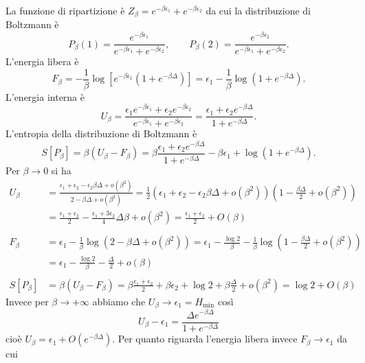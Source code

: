 \begin{solution}
    La funzione di ripartizione è $ Z_\beta = e^{-\beta \epsilon_1} + e^{-\beta \epsilon_2} $ da cui la distribuzione di Boltzmann è
    \[
        P_\beta(1) = \frac{e^{-\beta\epsilon_1}}{e^{-\beta \epsilon_1} + e^{-\beta \epsilon_2}}, \qquad P_\beta(2) = \frac{e^{-\beta\epsilon_2}}{e^{-\beta \epsilon_1} + e^{-\beta \epsilon_2}}.
    \]
    L'energia libera è
    \[
        F_\beta = -\frac{1}{\beta} \log{\left[e^{-\beta\epsilon_1}(1+e^{-\beta\Delta})\right]} = \epsilon_1 - \frac{1}{\beta} \log{\left(1+e^{-\beta\Delta}\right)}.
    \]
    L'energia interna è
    \[
        U_\beta = \frac{\epsilon_1 e^{-\beta\epsilon_1} + \epsilon_2 e^{-\beta \epsilon_2}}{e^{-\beta \epsilon_1} + e^{-\beta \epsilon_2}} = \frac{\epsilon_1 + \epsilon_2 e^{-\beta\Delta}}{1+e^{-\beta\Delta}}.
    \]
    L'entropia della distribuzione di Boltzmann è
    \[
        S[P_\beta] = \beta(U_\beta - F_\beta) = \beta \frac{\epsilon_1 + \epsilon_2 e^{-\beta\Delta}}{1+e^{-\beta\Delta}} - \beta\epsilon_1 + \log{\left(1+e^{-\beta\Delta}\right)}.
    \]
    Per $ \beta \to 0 $ si ha
    \begin{align*}
        U_\beta & = \frac{\epsilon_1 + \epsilon_2 - \epsilon_2 \beta\Delta + o(\beta^2)}{2 - \beta\Delta + o(\beta^2)} = \frac{1}{2}(\epsilon_1 + \epsilon_2 - \epsilon_2 \beta\Delta + o(\beta^2))\left(1 - \frac{\beta \Delta}{2} + o(\beta^2)\right) \\
        & = \frac{\epsilon_1 + \epsilon_2}{2} - \frac{\epsilon_1 + 3\epsilon_2}{4} \Delta \beta + o(\beta^2) = \frac{\epsilon_1 + \epsilon_2}{2} + O(\beta) \\
        & \ \\
        F_\beta & = \epsilon_1 - \frac{1}{\beta} \log{\left(2 - \beta\Delta + o(\beta^2)\right)} = \epsilon_1 - \frac{\log{2}}{\beta} - \frac{1}{\beta}\log{\left(1 - \frac{\beta\Delta}{2} + o(\beta^2)\right)} \\
        & = \epsilon_1 - \frac{\log{2}}{\beta} - \frac{\Delta}{2} + o(\beta) \\
        & \ \\
        S[P_\beta] & = \beta(U_\beta - F_\beta) = \beta \frac{\epsilon_1 + \epsilon_2}{2} + \beta \epsilon_2 + \log{2} + \beta\frac{\Delta}{2} + o(\beta^2) = \log{2} + O(\beta)
    \end{align*}
    Invece per $ \beta \to +\infty $ abbiamo che $ U_\beta \to \epsilon_1 = H_\mathrm{min} $ così
    \[
        U_\beta - \epsilon_1 = \frac{\Delta e^{-\beta\Delta}}{1+e^{-\beta\Delta}}
    \]
    cioè $ U_\beta = \epsilon_1 + O(e^{-\beta\Delta}) $. Per quanto riguarda l'energia libera invece $ F_\beta \to \epsilon_1 $ da cui

\end{solution}
